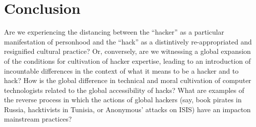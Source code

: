 \documentclass[10pt,letter,oneside]{scrartcl}
\begin{document}
%
%

\section*{Conclusion}

Are we experiencing the distancing between the ``hacker'' as a particular
manifestation of personhood and the ``hack'' as a distintively re-appropriated 
and resignified cultural practice? Or, conversely, are we witnessing a 
global expansion of the conditions for cultivation of hacker expertise,
leading to an introduction of incountable differences in the context of 
what it means to be a hacker and to hack? How is the global difference in 
technical and moral cultivation of computer technologists related to the global accessibility of hacks?  What are examples of the reverse process in which the 
actions of global hackers (say, book pirates in Russia, hacktivists in Tunisia, 
or Anonymous' attacks on ISIS) have an impacton mainstream practices?
\end{document}
